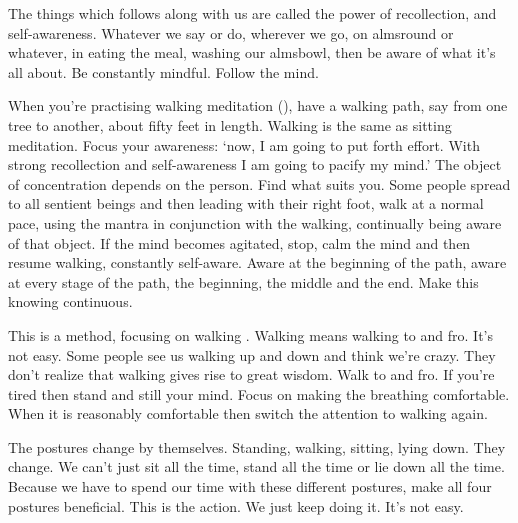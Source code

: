  The things which follows along with us are called  the power of recollection, and  self-awareness. Whatever we say or do, wherever we go, on almsround or whatever, in eating the meal, washing our almsbowl, then be aware of what it's all about. Be constantly mindful. Follow the mind. 

 When you're practising walking meditation (), have a walking path, say from one tree to another, about fifty feet in length. Walking  is the same as sitting meditation. Focus your awareness: `now, I am going to put forth effort. With strong recollection and self-awareness I am going to pacify my mind.' The object of concentration depends on the person. Find what suits you. Some people spread  to all sentient beings and then leading with their right foot, walk at a normal pace, using the mantra  in conjunction with the walking, continually being aware of that object. If the mind becomes agitated, stop, calm the mind and then resume walking, constantly self-aware. Aware at the beginning of the path, aware at every stage of the path, the beginning, the middle and the end. Make this knowing continuous. 

 This is a method, focusing on walking . Walking  means walking to and fro. It's not easy. Some people see us walking up and down and think we're crazy. They don't realize that walking  gives rise to great wisdom. Walk to and fro. If you're tired then stand and still your mind. Focus on making the breathing comfortable. When it is reasonably comfortable then switch the attention to walking again.

 The postures change by themselves. Standing, walking, sitting, lying down. They change. We can't just sit all the time, stand all the time or lie down all the time. Because we have to spend our time with these different postures, make all four postures beneficial. This is the action. We just keep doing it. It's not easy. 

